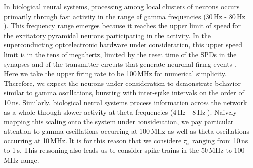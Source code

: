 \documentclass[twocolumn]{article}
\begin{document}
In biological neural systems, processing among local clusters of neurons occurs primarily through fast activity in the range of gamma frequencies (30\,Hz - 80\,Hz \cite{budr2004,bu2006}). This frequency range emerges because it reaches the upper limit of speed for the excitatory pyramidal neurons participating in the activity. In the superconducting optoelectronic hardware under consideration, this upper speed limit is in the tens of megahertz, limited by the reset time of the SPDs in the synapses and of the transmitter circuits that generate neuronal firing events \cite{sh2018_full}. Here we take the upper firing rate to be 100\,MHz for numerical simplicity. Therefore, we expect the neurons under consideration to demonstrate behavior similar to gamma oscillations, bursting with inter-spike intervals on the order of 10\,ns. Similarly, biological neural systems process information across the network as a whole through slower activity at theta frequencies (4\,Hz - 8\,Hz \cite{budr2004,bu2006}). Naively mapping this scaling onto the system under consideration, we pay particular attention to gamma oscillations occurring at 100\,MHz as well as theta oscillations occurring at 10\,MHz. It is for this reason that we considere $\tau_{\mathrm{si}}$ ranging from 10\,ns to 1\,\textmu s. This reasoning also leads us to consider spike trains in the 50\,MHz to 100\,MHz range. 
\end{document}
